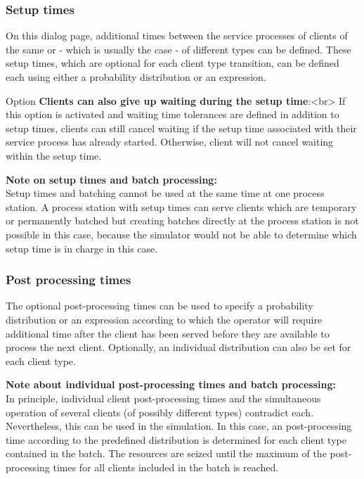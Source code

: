 \subsubsection*{Setup times}

On this dialog page, additional times between the service processes of clients of the same
or - which is usually the case - of different types can be defined. These setup times,
which are optional for each client type transition, can be defined each using either a
probability distribution or an expression.

Option \textbf{Clients can also give up waiting during the setup time}:<br>
If this option is activated and waiting time tolerances are defined in addition
to setup times, clients can still cancel waiting if the setup time associated
with their service process has already started. Otherwise, client will not
cancel waiting within the setup time.	

\textbf{Note on setup times and batch processing:}~\\
Setup times and batching cannot be used at the same time at one process station.
A process station with setup times can serve clients which are temporary or
permanently batched but creating batches directly at the process station is
not possible in this case, because the simulator would not be able to determine
which setup time is in charge in this case.

\subsubsection*{Post processing times}

The optional post-processing times can be used to specify a probability distribution or an expression
according to which the operator will require additional time after the client has been served before they are
available to process the next client. Optionally, an individual distribution can also be set
for each client type.

\textbf{Note about individual post-processing times and batch processing:}~\\
In principle, individual client post-processing times and the simultaneous operation of several clients
(of possibly different types) contradict each. Nevertheless, this can be used in the simulation.
In this case, an post-processing time according to the predefined distribution is determined for each
client type contained in the batch. The resources are seized until the maximum of the post-processing times
for all clients included in the batch is reached.


